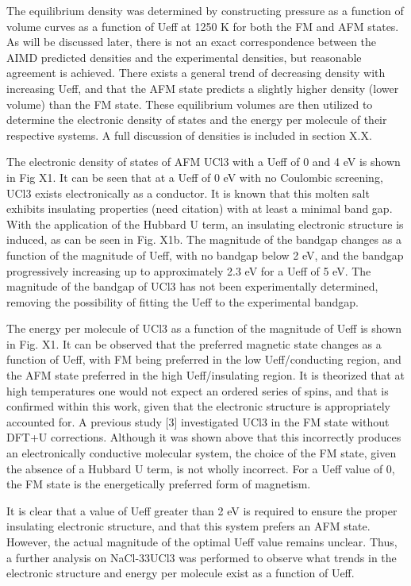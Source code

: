 \documentclass[preprint,3p,10pt,twocolumn,number,sort&compress]{elsarticle}
\begin{document}
The equilibrium density was determined by constructing pressure as a function of volume curves as a function of Ueff at 1250 K for both the FM and AFM states. As will be discussed later, there is not an exact correspondence between the AIMD predicted densities and the experimental densities, but reasonable agreement is achieved. There exists a general trend of decreasing density with increasing Ueff, and that the AFM state predicts a slightly higher density (lower volume) than the FM state. These equilibrium volumes are then utilized to determine the electronic density of states and the energy per molecule of their respective systems. A full discussion of densities is included in section X.X. 

The electronic density of states of AFM UCl3 with a Ueff of 0 and 4 eV is shown in Fig X1. It can be seen that at a Ueff of 0 eV with no Coulombic screening, UCl3 exists electronically as a conductor. It is known that this molten salt exhibits insulating properties (need citation) with at least a minimal band gap. With the application of the Hubbard U term, an insulating electronic structure is induced, as can be seen in Fig. X1b. The magnitude of the bandgap changes as a function of the magnitude of Ueff, with no bandgap below 2 eV, and the bandgap progressively increasing up to approximately 2.3 eV for a Ueff of 5 eV. The magnitude of the bandgap of UCl3 has not been experimentally determined, removing the possibility of fitting the Ueff to the experimental bandgap. 

The energy per molecule of UCl3 as a function of the magnitude of Ueff is shown in Fig. X1. It can be observed that the preferred magnetic state changes as a function of Ueff, with FM being preferred in the low Ueff/conducting region, and the AFM state preferred in the high Ueff/insulating region. It is theorized that at high temperatures one would not expect an ordered series of spins, and that is confirmed within this work, given that the electronic structure is appropriately accounted for. A previous study [3] investigated UCl3 in the FM state without DFT+U corrections. Although it was shown above that this incorrectly produces an electronically conductive molecular system, the choice of the FM state, given the absence of a Hubbard U term, is not wholly incorrect. For a Ueff value of 0, the FM state is the energetically preferred form of magnetism.  

It is clear that a value of Ueff greater than 2 eV is required to ensure the proper insulating electronic structure, and that this system prefers an AFM state. However, the actual magnitude of the optimal Ueff value remains unclear. Thus, a further analysis on NaCl-33UCl3 was performed to observe what trends in the electronic structure and energy per molecule exist as a function of Ueff. 
\end{document}
